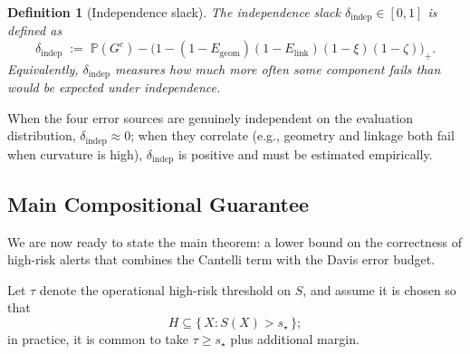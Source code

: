 \documentclass[11pt]{article}
\newcommand{\Prob}{\mathbb{P}}
\newtheorem{definition}{Definition}
\begin{document}
\begin{definition}[Independence slack]
The independence slack $\delta_{\mathrm{indep}} \in [0,1]$ is defined as
\[
\delta_{\mathrm{indep}}
\;:=\;
\Prob(G^c) -
\bigl(1 - (1-E_{\mathrm{geom}})(1-E_{\mathrm{link}})(1-\xi)(1-\zeta)\bigr)_+.
\]
Equivalently, $\delta_{\mathrm{indep}}$ measures how much more often \emph{some} component fails
than would be expected under independence.
\end{definition}

When the four error sources are genuinely independent on the evaluation distribution, 
$\delta_{\mathrm{indep}}\approx 0$; when they correlate (e.g., geometry and linkage both fail when
curvature is high), $\delta_{\mathrm{indep}}$ is positive and must be estimated empirically.

\subsection{Main Compositional Guarantee}

We are now ready to state the main theorem: a lower bound on the correctness of high-risk alerts
that combines the Cantelli term with the Davis error budget.

Let $\tau$ denote the operational high-risk threshold on $S$, and assume it is chosen so that
\[
H \subseteq \{\,X : S(X) > s_\star\,\};
\]
in practice, it is common to take $\tau \ge s_\star$ plus additional margin.
\end{document}
